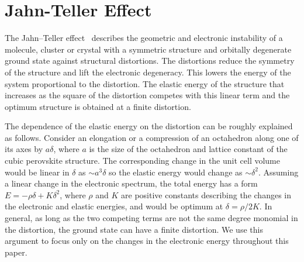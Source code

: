\documentclass[a4paper,prb,twocolumn]{revtex4-1}  %
\newcommand{\com}[1]{}
\newcommand{\az}[1]{{\color{magenta}{#1}}} %
\begin{document}
\com{
$V_{oct}(\vec r)$ causes the d-orbitals to split into two manifolds,
$t_{2g}$  and $e_g$, where $t_{2g}$ contains three degenerate states ($xy,yz,zx$) while $e_g$ has two degenerate states ($x^2-y^2,z^2$).
The crystal field splitting between the two manifolds is
${\Delta=\frac{160}{3}\frac{q_o}{a} D_{4}}$.
\az{We will see how these degeneracies are lifted as we elongate (or compress)
the octahedron along a ....??}
}


\section{Jahn-Teller Effect}
\label{sec:JT}



The Jahn--Teller 
effect~\cite{JahnPRSL37,JahnPRSL38,
OpikRS57,
Sturge68,
GehringRPP75,
BersukerCCR75,
KugelSPU82,
MillisN98,
LufasoAC04,
TerakuraPMS07,
HalcrowRSC13,
PavariniChap,
KhomskiiCR21}
 describes the 
geometric and electronic instability of a %
molecule, cluster or crystal with
a symmetric structure and orbitally degenerate ground state
against structural distortions.
The distortions  
reduce the symmetry of the structure
and lift the electronic degeneracy.
This lowers the energy of the system proportional to
the distortion.
The elastic energy of the structure that increases as the square of the distortion
competes with this linear term and the optimum structure 
is obtained at a finite distortion.


The dependence of the elastic energy on the distortion can be roughly explained
as follows.
Consider an 
elongation or a compression of an octahedron along one of its axes by $a\delta$,
where $a$ is the size of the octahedron and lattice constant of the cubic perovskite structure.
The corresponding change in the unit cell volume would be linear in $\delta$
as $\sim a^3 \delta$
so the elastic energy
would change as $\sim\delta^2$.
Assuming a linear change 
 in the electronic spectrum,
  the total energy has a form
$E=-\rho\delta + K \delta^2$, where $\rho$ and $K$ are positive constants 
describing the changes in the electronic and elastic energies,
and would be optimum at $\delta=\rho/2K$.
In general, as long as the two competing terms 
are not the same degree monomial in the distortion,
the ground state can have a finite distortion.
We use this argument to focus only on the changes
 in the electronic energy throughout this paper.
\end{document}
